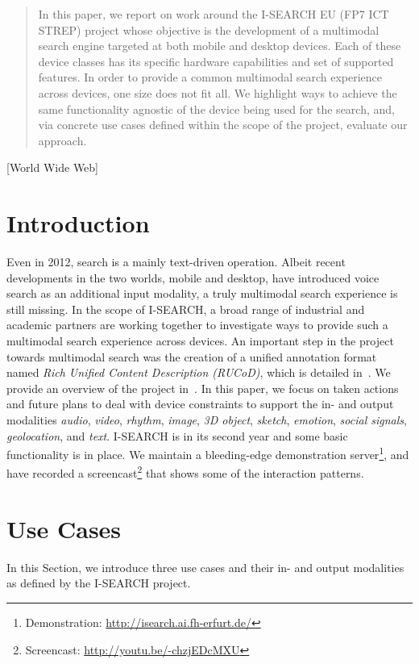 \documentclass{acm_proc_article-sp}
\let\oldemph\emph
\renewcommand{\emph}[1]{\oldemph{\fontsize{9}{9}\selectfont #1}}
\newcommand{\inlinelistingsize}{\fontsize{8pt}{11pt}}
\let\oldurl\url
\renewcommand{\url}[1]{\inlinelistingsize\oldurl{#1}}
\begin{document}
\begin{abstract}
In this paper, we report on work around the \mbox{I-SEARCH} EU (FP7 ICT STREP) project whose objective is the development of a multimodal search engine targeted at both mobile and desktop devices.
Each of these device classes has its specific hardware capabilities and set of supported features.
In order to provide a common multimodal search experience across devices, one size does not fit all.
We highlight ways to achieve the same functionality agnostic of the device being used for the search, and, via concrete use cases defined within the scope of the project, evaluate our approach.
\end{abstract}

[World Wide Web]


\section{Introduction} \label{sec:introduction}
Even in 2012, search is a mainly text-driven operation.
Albeit recent developments in the two worlds, mobile and desktop, have introduced voice search as an additional input modality, a truly multimodal search experience is still missing.
In the scope of \mbox{I-SEARCH}, a broad range of industrial and academic partners are working together to investigate ways to provide such a multimodal search experience across devices.
An important step in the project towards multimodal search was the creation of a unified annotation format named \emph{Rich Unified Content Description (RUCoD)}, which is detailed in~\cite{ijmis2010}.
We provide an overview of the project in~\cite{www2012}.
In this paper, we focus on taken actions and future plans to deal with device constraints to support the in- and output modalities \emph{audio}, \emph{video}, \emph{rhythm}, \emph{image}, \emph{3D object}, \emph{sketch}, \emph{emotion}, \emph{social signals}, \emph{geolocation}, and \emph{text}.
\mbox{I-SEARCH} is in its second year and some basic functionality is in place.
We maintain a bleeding-edge demonstration server\footnote{Demonstration: \url{http://isearch.ai.fh-erfurt.de/}}, and have recorded a screencast\footnote{Screencast: \url{http://youtu.be/-chzjEDcMXU}} that shows some of the interaction patterns.

\section{Use Cases} \label{sec:usecases}
In this Section, we introduce three use cases and their in- and output modalities as defined by the \mbox{I-SEARCH} project.
\end{document}
